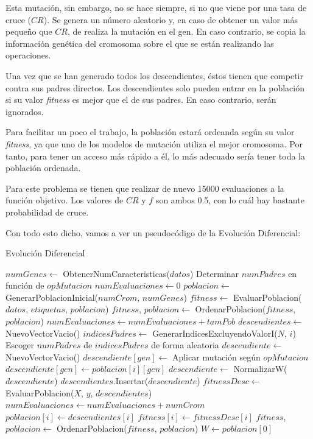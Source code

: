 \documentclass[11pt,a4paper]{article}
\begin{document}
Esta mutación, sin embargo, no se hace siempre, si no que viene por una tasa de cruce ($CR$). Se genera un número aleatorio y,
en caso de obtener un valor más pequeño que $CR$, de realiza la mutación en el gen. En caso contrario, se copia la información
genética del cromosoma sobre el que se están realizando las operaciones.

Una vez que se han generado todos los descendientes, éstos tienen que competir contra sus padres directos. Los descendientes
solo pueden entrar en la población si su valor \textit{fitness} es mejor que el de sus padres. En caso contrario, serán ignorados.

Para facilitar un poco el trabajo, la población estará ordeanda según su valor \textit{fitness}, ya que uno de los modelos de
mutación utiliza el mejor cromosoma. Por tanto, para tener un acceso más rápido a él, lo más adecuado sería tener toda la población
ordenada.

Para este problema se tienen que realizar de nuevo 15000 evaluaciones a la función objetivo. Los valores de $CR$ y $f$ son
ambos 0.5, con lo cuál hay bastante probabilidad de cruce.

Con todo esto dicho, vamos a ver un pseudocódigo de la Evolución Diferencial:

\begin{algorithm}[H]
\caption{Evolución Diferencial}
\begin{algorithmic}[1]
\State $numGenes \gets$ ObtenerNumCaracteristicas($datos$)
\State Determinar $numPadres$ en función de $opMutacion$
\State $numEvaluaciones \gets 0$
\State $poblacion \gets$ GenerarPoblacionInicial($numCrom$, $numGenes$)
\State $fitness \gets$ EvaluarPoblacion($datos$, $etiquetas$, $poblacion$)
\State $fitness$, $poblacion \gets$ OrdenarPoblacion($fitness$, $poblacion$)
\State $numEvaluaciones \gets numEvaluaciones + tamPob$
	\State $descendientes \gets$ NuevoVectorVacio()
		\State $indicesPadres \gets$ GenerarIndicesExcluyendoValorI($N$, $i$)
		\State Escoger $numPadres$ de $indicesPadres$ de forma aleatoria
		\State $descendiente \gets$ NuevoVectorVacio()
				\State $descendiente[gen] \gets$ Aplicar mutación según $opMutacion$
			\Else{}
				\State $descendiente[gen] \gets poblacion[i][gen]$
			\EndIf
		\EndFor
		\State $descendiente \gets$ NormalizarW($descendiente$)
		\State $descendientes$.Insertar($descendiente$)
	\EndFor
	\State $fitnessDesc \gets$ EvaluarPoblacion($X$, $y$, $descendientes$)
	\State $numEvaluaciones \gets numEvaluaciones + numCrom$
			\State $poblacion[i] \gets descendientes[i]$
			\State $fitness[i] \gets fitnessDesc[i]$
		\EndIf
	\EndFor
	\State $fitness$, $poblacion \gets$ OrdenarPoblacion($fitness$, $poblacion$)
\EndWhile
\State $W \gets poblacion[0]$
\State {}
\EndFunction
\end{algorithmic}
\end{algorithm}
\end{document}
